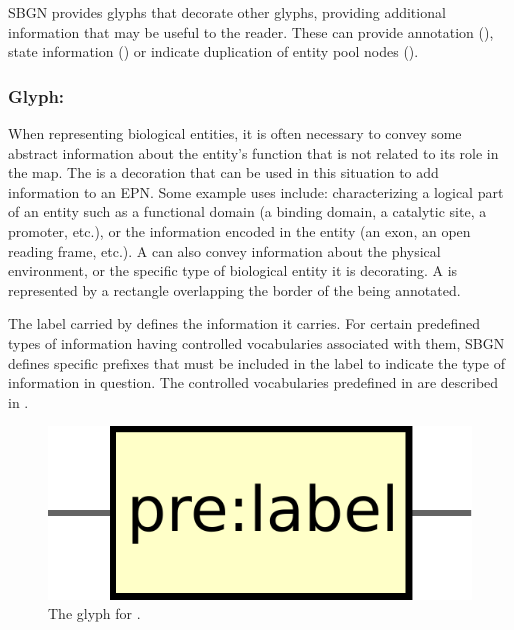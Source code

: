 SBGN \PD provides glyphs that decorate other glyphs, providing additional information that may be useful to the reader. These can provide annotation (\hyperref[sec:unitInfo]{}), state information (\hyperref[sec:stateVariable]{}) or indicate duplication of entity pool nodes (\hyperref[sec:cloneMarker]{}).

\subsubsection{Glyph: }
\label{sec:unitInfo}

When representing biological entities, it is often necessary to convey some abstract information about the entity's function that is not related to its role in the map.  The  is a decoration that can be used in this situation to add information to an EPN.  Some example uses include: characterizing a logical part of an entity such as a functional domain (a binding domain, a catalytic site, a promoter, etc.), or the information encoded in the entity (an exon, an open reading frame, etc.).  A  can also convey information about the physical environment, or the specific type of biological entity it is decorating. A  is represented by a rectangle overlapping the border of the  being annotated.

The label carried by  defines the information it carries.  For certain predefined types of information having controlled vocabularies associated with them, SBGN defines specific prefixes that must be included in the label to indicate the type of information in question.  The controlled vocabularies predefined in \SBGNPDLone are described in .

\begin{figure}[htb]
  \centering
  \includegraphics[scale = 0.3]{le_images/unitInformation}
  \caption{The \PD glyph for .}
  \label{fig:unitInfo}
\end{figure}

